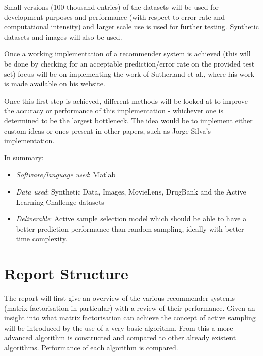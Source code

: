 Small versions (100 thousand entries) of the datasets will be used for development purposes and performance (with respect to error rate and computational intensity) and larger scale use is used for further testing. Synthetic datasets and images will also be used.

Once a working implementation of a recommender system is achieved (this will be done by checking for an acceptable prediction/error rate on the provided test set) focus will be on implementing the work of Sutherland et al.\cite{active-mf}, where his work is made available on his website.

Once this first step is achieved, different methods will be looked at to improve the accuracy or performance of this implementation -  whichever one is determined to be the largest bottleneck. The idea would be to implement either custom ideas or ones present in other papers, such as Jorge Silva's\cite{silva} implementation.

In summary:
\begin{itemize}
\item \textit{Software/language used}: Matlab
\item \textit{Data used}: Synthetic Data, Images, MovieLens, DrugBank and the Active Learning Challenge datasets
\item \textit{Deliverable}: Active sample selection model which should be able to have a better prediction performance than random sampling, ideally with better time complexity.
\end{itemize}

\section{Report Structure}
The report will first give an overview of the various recommender systems (matrix factorisation in particular) with a review of their performance. Given an insight into what matrix factorisation can achieve the concept of active sampling will be introduced by the use of a very basic algorithm. From this a more advanced algorithm is constructed and compared to other already existent algorithms. Performance of each algorithm is compared.


